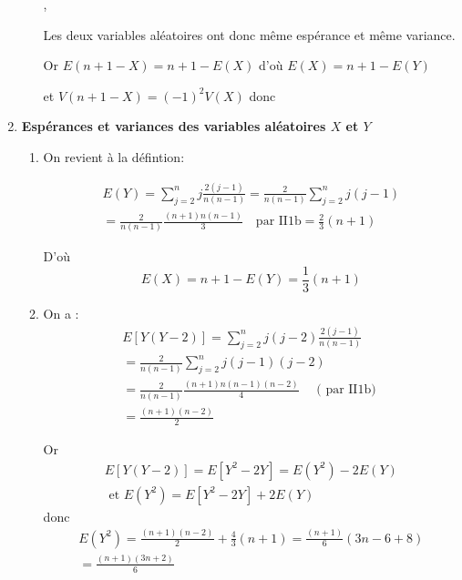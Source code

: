 \begin{enumerate}
\begin{enumerate}
,

Les deux variables aléatoires  ont donc m\^eme esp\'erance et même variance.


Or $E\left( n+1-X\right) =n+1-E\left( X\right) $ d'o\`u $E\left( X\right)
=n+1-E\left( Y\right) $

et $V\left( n+1-X\right) =\left( -1\right) ^{2}V\left( X\right) $ donc

\end{enumerate}

\item \textbf{Esp\'erances et variances des variables al\'eatoires $X$ et $Y$}

\begin{enumerate}
\item On revient \`a la d\'efintion:

\begin{multline*}
E\left( Y\right) 
 = \sum_{j=2}^{n}j\frac{2\left( j-1\right) }{n\left(n-1\right) } 
 = \frac{2}{n\left( n-1\right) }\sum_{j=2}^{n}j\left( j-1\right) \\
 = \frac{2}{n\left( n-1\right) }\frac{\left( n+1\right) n\left( n-1\right) }{3}\quad \text{par II1b} 
 = \frac{2}{3}\left( n+1\right)
\end{multline*}


D'o\`u $$E\left( X\right) =n+1-E\left( Y\right) =\frac{1}{3}\left( n+1\right) $$

\item On a :%
\begin{multline*}
E\left[ Y\left( Y-2\right) \right] 
 = \sum_{j=2}^{n}j\left( j-2\right) \frac{2\left( j-1\right) }{n\left( n-1\right) } \\
 = \frac{2}{n\left( n-1\right) }\sum_{j=2}^{n}j\left( j-1\right) \left(j-2\right) \\
 = \frac{2}{n\left( n-1\right) }\frac{\left( n+1\right) n\left( n-1\right)\left( n-2\right) }{4} \quad \text{ ( par II1b) } \\
 = \frac{\left( n+1\right) \left( n-2\right) }{2}
\end{multline*}

Or
\begin{multline*}
E\left[ Y\left( Y-2\right) \right]
 = E\left[ Y^{2}-2Y\right] =E\left(Y^{2}\right) -2E\left( Y\right)
 \\ \text{ et }
 E\left( Y^{2}\right) =E\left[ Y^{2}-2Y \right] +2E\left( Y\right)  
\end{multline*}
donc 
\begin{multline*}
E\left( Y^{2}\right) 
 = \frac{\left( n+1\right) \left( n-2\right) }{2}+\frac{4}{3}\left( n+1\right) 
 = \frac{\left( n+1\right) }{6}\left( 3n-6+8\right) \\
 = \frac{\left( n+1\right) \left( 3n+2\right) }{6}
\end{multline*}


\end{enumerate}
\end{enumerate}
